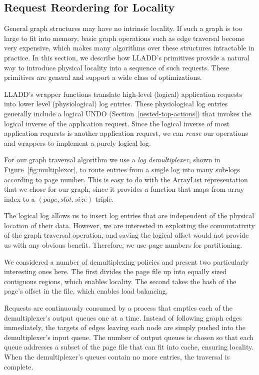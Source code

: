 \documentclass[10pt,letterpaper,twocolumn,english]{article}
\newcommand{\yad}{LLADD\xspace}
\begin{document}
\subsection {Request Reordering for Locality}

General graph structures may have no intrinsic locality.  If such a
graph is too large to fit into memory, basic graph operations such as
edge traversal become very expensive, which makes many algorithms over
these structures intractable in practice.  In this section, we
describe how \yad's primitives provide a natural way to introduce
physical locality into a sequence of such requests.  These primitives
are general and support a wide class of optimizations.

\yad's wrapper functions translate high-level (logical) application
requests into lower level (physiological) log entries.  These
physiological log entries generally include a logical UNDO
(Section~\ref{nested-top-actions}) that invokes the logical
inverse of the application request.  Since the logical inverse of most
application requests is another application request, we can {\em reuse} our
operations and wrappers to implement a purely logical log.

For our graph traversal algorithm we use a {\em log demultiplexer},
shown in Figure~\ref{fig:multiplexor}, to route entries from a single
log into many sub-logs according to page number.  This is easy to do
with the ArrayList representation that we chose for our graph, since
it provides a function that maps from
array index to a $(page, slot, size)$ triple.

The logical log allows us to insert log entries that are independent
of the physical location of their data.  However, we are
interested in exploiting the commutativity of the graph traversal
operation, and saving the logical offset would not provide us with any
obvious benefit.  Therefore, we use page numbers for partitioning.

We considered a number of demultiplexing policies and present two
particularly interesting ones here.  The first divides the page file
up into equally sized contiguous regions, which enables locality.  The second takes the hash
of the page's offset in the file, which enables load balancing.

Requests are continuously consumed by a process that empties each of
the demultiplexer's output queues one at a time.  Instead of following
graph edges immediately, the targets of edges leaving each node are
simply pushed into the demultiplexer's input queue.  The number of
 output queues is chosen so that each queue addresses a
subset of the page file that can fit into cache, ensuring locality.  When the
demultiplexer's queues contain no more entries, the traversal is
complete.  
\end{document}

